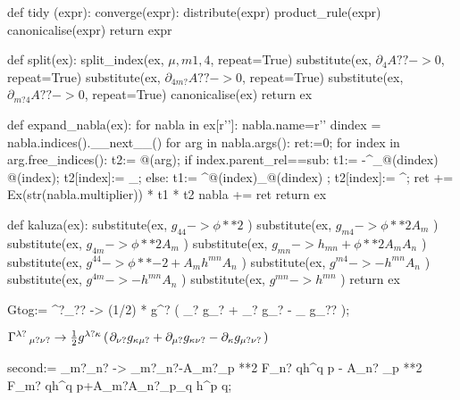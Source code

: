 \documentclass[10pt]{article}
\newcommand\brwrap[3]{%
  \setbox0=\hbox{$#2$}
  \left#1\vbox to \the\ht0{\hbox to 0pt{}}\right.\kern-.2em
  \begingroup #2\endgroup\kern-.15em
  \left.\vbox to \the\ht0{\hbox to 0pt{}}\right#3
}
\begin{document}
\begin{python}
def tidy (expr):
   converge(expr):
       distribute(expr)
       product_rule(expr)
       canonicalise(expr)
   return expr
\end{python}
\begin{python}
def split(ex):
	split_index(ex, $\mu, m1, 4$, repeat=True)
	substitute(ex, $\partial_{4}{A??} -> 0$, repeat=True)
	substitute(ex, $\partial_{4 m?}{A??} -> 0$, repeat=True)
	substitute(ex, $\partial_{m? 4}{A??} -> 0$, repeat=True)
	canonicalise(ex)
	return ex
\end{python}
\begin{python}
def expand_nabla(ex):
    for nabla in ex[r'\nabla']:
        nabla.name=r'\partial'
        dindex = nabla.indices().__next__() 
        for arg in nabla.args():             
            ret:=0;
            for index in arg.free_indices():
                t2:= @(arg);
                if index.parent_rel==sub:
                    t1:= -\Gamma^{\rho}_{@(dindex) @(index)};
                    t2[index]:= _{\rho};
                else:
                    t1:=  \Gamma^{@(index)}_{@(dindex) \rho};
                    t2[index]:= ^{\rho};
                ret += Ex(str(nabla.multiplier)) * t1 * t2
            nabla += ret
    return ex
\end{python}
\begin{python}
def kaluza(ex):
	substitute(ex, $g_{4 4} -> \phi**{2}$ )
	substitute(ex, $g_{m 4} -> \phi**{2} A_{m}$ )
	substitute(ex, $g_{4 m} -> \phi**{2} A_{m}$ )
	substitute(ex, $g_{m n} -> h_{m n} + \phi**{2} A_{m} A_{n}$ )
	substitute(ex, $g^{4 4} -> \phi**{-2} +  A_{m} h^{m n} A_{n}$ )
	substitute(ex, $g^{m 4} -> - h^{m n} A_{n}$ )
	substitute(ex, $g^{4 m} -> - h^{m n} A_{n}$ )
	substitute(ex, $g^{m n} -> h^{m n}$ )
	return ex
\end{python}
\begin{python}
Gtog:= \Gamma^{\lambda?}_{\mu?\nu?} ->
  (1/2) * g^{\lambda?\kappa} ( 
        \partial_{\nu?}{ g_{\kappa\mu?} } + \partial_{\mu?}{ g_{\kappa\nu?} } - \partial_{\kappa}{ g_{\mu?\nu?} } );
\end{python}
\begin{adjustwidth}{1em}{0cm}${}\Gamma^{\lambda?}\,_{\mu? \nu?} \rightarrow \frac{1}{2}g^{\lambda? \kappa} \brwrap{(}{\partial_{\nu?}{g_{\kappa \mu?}}+\partial_{\mu?}{g_{\kappa \nu?}}-\partial_{\kappa}{g_{\mu? \nu?}}}{)}$\end{adjustwidth}
\begin{python}
second:= \nabla_{m?}{\nabla_{n?}{\pi}} -> \nabla_{m?}{\partial_{n?}{\pi}}-A_{m?}\partial_{p}{\pi} {\phi}**{2} F_{n? q}h^{q p} - A_{n?} \partial_{p}{\pi} {\phi}**{2} F_{m? q}h^{q p}+A_{m?}A_{n?}\partial_{p}{\phi}\partial_{q}{\pi} \phi h^{p q};
\end{python}
\end{document}
